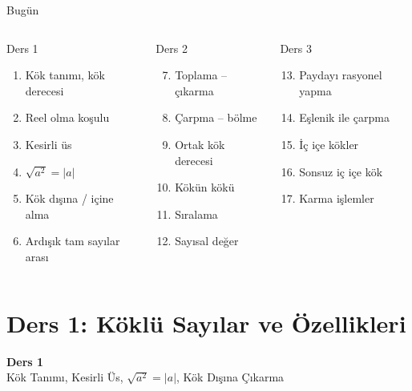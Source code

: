 \documentclass[aspectratio=169,11pt]{beamer}
\begin{document}
\begin{frame}{Bugün}
\begin{columns}[t]
\begin{block}{Ders 1}
\begin{enumerate}
\item Kök tanımı, kök derecesi
\item Reel olma koşulu
\item Kesirli üs
\item \(\sqrt{a^2}=|a|\)
\item Kök dışına / içine alma
\item Ardışık tam sayılar arası
\end{enumerate}
\end{block}
\begin{block}{Ders 2}
\begin{enumerate}\setcounter{enumi}{6}
\item Toplama -- çıkarma
\item Çarpma -- bölme
\item Ortak kök derecesi
\item Kökün kökü
\item Sıralama
\item Sayısal değer
\end{enumerate}
\end{block}
\begin{block}{Ders 3}
\begin{enumerate}\setcounter{enumi}{12}
\item Paydayı rasyonel yapma
\item Eşlenik ile çarpma
\item İç içe kökler
\item Sonsuz iç içe kök
\item Karma işlemler
\end{enumerate}
\end{block}
\end{columns}
\end{frame}

\section{Ders 1: Köklü Sayılar ve Özellikleri}
\begin{frame}
\centering\Large\color{anamavi}\textbf{Ders 1}\\[6pt]\normalsize Kök Tanımı, Kesirli Üs, \(\sqrt{a^2}=|a|\), Kök Dışına Çıkarma
\end{frame}
\end{document}

